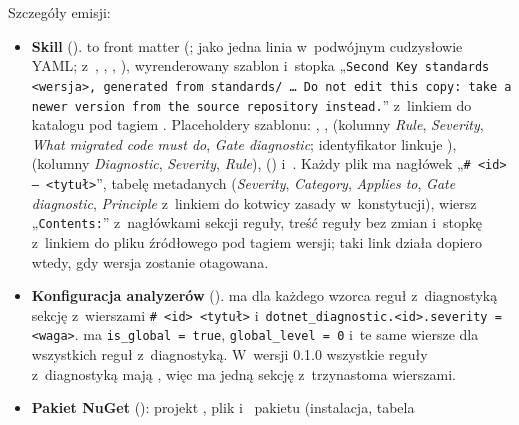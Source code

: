 Szczegóły emisji:

\begin{itemize}
  \item \textbf{Skill} ().  to front matter
        (;  jako jedna linia w~podwójnym cudzysłowie YAML;
         z~, , ,
        ), wyrenderowany szablon i~stopka „\texttt{Second Key standards
        <wersja>, generated from standards/ … Do not edit this copy: take a newer version from
        the source repository instead.}” z~linkiem do katalogu  pod tagiem
        . Placeholdery szablonu: ,
        ,  (kolumny \emph{Rule},
        \emph{Severity}, \emph{What migrated code must do}, \emph{Gate diagnostic}; identyfikator
        linkuje ),  (kolumny
        \emph{Diagnostic}, \emph{Severity}, \emph{Rule}), 
        () i~. Każdy plik
         ma nagłówek „\texttt{\# <id> — <tytuł>}”, tabelę metadanych
        (\emph{Severity}, \emph{Category}, \emph{Applies to}, \emph{Gate diagnostic},
        \emph{Principle} z~linkiem do kotwicy zasady w~konstytucji), wiersz
        „\texttt{Contents:}” z~nagłówkami sekcji reguły, treść reguły bez zmian i~stopkę
        z~linkiem do pliku źródłowego pod tagiem wersji; taki link działa dopiero wtedy,
        gdy wersja zostanie otagowana.
  \item \textbf{Konfiguracja analyzerów} ().
         ma dla każdego wzorca  reguł z~diagnostyką
        sekcję \repopath{[wzorzec]} z~wierszami \texttt{\# <id> <tytuł>}
        i~\texttt{dotnet\_diagnostic.<id>.severity = <waga>}.  ma
        \texttt{is\_global = true}, \texttt{global\_level = 0} i~te same wiersze dla wszystkich
        reguł z~diagnostyką. W~wersji 0.1.0 wszystkie reguły z~diagnostyką mają
         , więc  ma jedną sekcję
        \repopath{[*.cs]} z~trzynastoma wierszami.
  \item \textbf{Pakiet NuGet} (): projekt
        , plik
         i~ pakietu (instalacja, tabela

\end{itemize}
